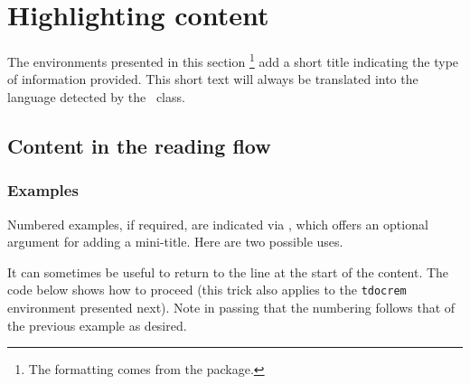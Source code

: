 \section{Highlighting content}

\begin{tdocnote}
    The environments presented in this section
    \footnote{
        The formatting comes from the  package.
    }
    add a short title indicating the type of information provided.
    This short text will always be translated into the language detected by the \thisproj\ class.
\end{tdocnote}


\subsection{Content in the reading flow}








\subsubsection{Examples}

Numbered examples, if required, are indicated via , which offers an optional argument for adding a mini-title.
Here are two possible uses.






\begin{tdoctip}
    It can sometimes be useful to return to the line at the start of the content. The code below shows how to proceed (this trick also applies to the \verb#tdocrem# environment presented next). Note in passing that the numbering follows that of the previous example as desired.
\end{tdoctip}

